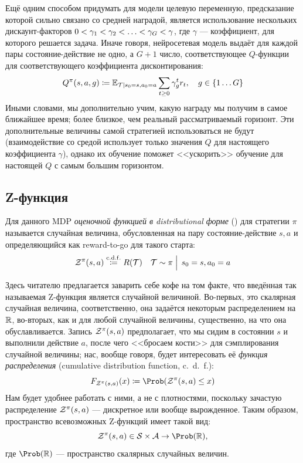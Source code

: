 \begin{remark}
Ещё одним способом придумать для модели целевую переменную, предсказание которой сильно связано со средней наградой, является использование нескольких дискаунт-факторов $0 \HM< \gamma_1 \HM< \gamma_2 \HM< \dots \HM< \gamma_G \HM< \gamma$, где $\gamma$ --- коэффициент, для которого решается задача. Иначе говоря, нейросетевая модель выдаёт для каждой пары состояние-действие не одно, а $G+1$ число, соответствующее $Q$-функции для соответствующего коэффициента дисконтирования:
$$Q^\pi(s, a, g) \coloneqq \mathbb{E}_{\mathcal{T} \mid s_0 = s, a_0 = a} \sum_{t \ge 0} \gamma_g^t r_t, \quad g \in \{1 \dots G \}$$
Иными словами, мы дополнительно учим, какую награду мы получим в самое ближайшее время; более близкое, чем реальный рассматриваемый горизонт. Эти дополнительные величины самой стратегией использоваться не будут (взаимодействие со средой использует только значения $Q$ для настоящего коэффициента $\gamma$), однако их обучение поможет <<ускорить>> обучение для настоящей $Q$ с самым большим горизонтом. 
\end{remark}

\subsection{Z-функция}

\begin{definition} 
Для данного MDP \emph{оценочной функцией в distributional форме} () для стратегии $\pi$ называется случайная величина, обусловленная на пару состояние-действие $s, a$ и определяющийся как reward-to-go для такого старта:
$$\mathcal{Z}^\pi(s, a) \mathrel{\stackrel{\mathrm{c.d.f.}}\coloneqq} R(\mathcal{T}) \quad \mathcal{T} \sim \pi \mathrel{\Big|} \, s_0 = s, a_0 = a $$
\end{definition}

Здесь читателю предлагается заварить себе кофе на том факте, что введённая так называемая Z-функция является случайной величиной. Во-первых, это скалярная случайная величина, соответственно, она задаётся некоторым распределением на $\mathbb{R}$, во-вторых, как и для любой случайной величины, существенно, на что она обуславливается. Запись $\mathcal{Z}^\pi(s, a)$ предполагает, что мы сидим в состоянии $s$ и выполнили действие $a$, после чего <<бросаем кости>> для сэмплирования случайной величины; нас, вообще говоря, будет интересовать её \emph{функция распределения} (cumulative distribution function, c.~d.~f.):
$$F_{\Z^\pi(s, a)}(x) \coloneqq \Prob (\Z^\pi(s, a) \le x)$$
Нам будет удобнее работать с ними, а не с плотностями, поскольку зачастую распределение $\mathcal{Z}^\pi(s, a)$ --- дискретное или вообще вырожденное. Таким образом, пространство всевозможных Z-функций имеет такой вид:
\begin{equation}\label{Zfunctionspace}
\Z^\pi(s, a) \in \St \times \A \to \Prob (\R),
\end{equation}
где $\Prob (\R)$ --- пространство скалярных случайных величин. 

